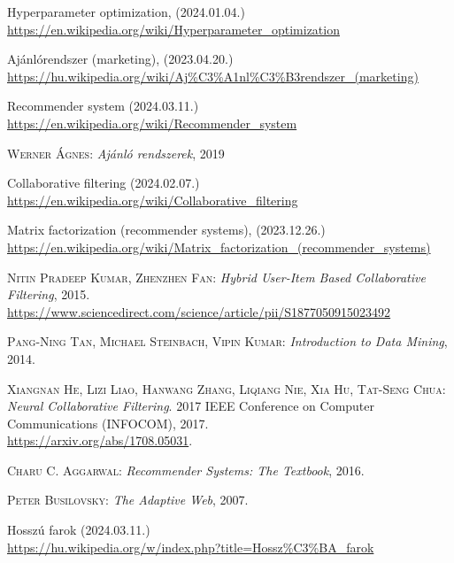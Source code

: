 \documentclass[
]{thesis-ekf}
\theoremstyle{definition}
\theoremstyle{remark}
\begin{document}
\begin{thebibliography}{2}
Hyperparameter optimization, (2024.01.04.)
\\\url{https://en.wikipedia.org/wiki/Hyperparameter_optimization}

Ajánlórendszer (marketing), (2023.04.20.)
\\\url{https://hu.wikipedia.org/wiki/Aj%C3%A1nl%C3%B3rendszer_(marketing)}

Recommender system (2024.03.11.)
\\\url{https://en.wikipedia.org/wiki/Recommender_system}

\textsc{Werner Ágnes}: \emph{Ajánló rendszerek}, 2019

Collaborative filtering (2024.02.07.)
\\\url{https://en.wikipedia.org/wiki/Collaborative_filtering}

Matrix factorization (recommender systems), (2023.12.26.)
\\\url{https://en.wikipedia.org/wiki/Matrix_factorization_(recommender_systems)}

\textsc{Nitin Pradeep Kumar, Zhenzhen Fan}: \emph{Hybrid User-Item Based Collaborative Filtering}, 2015. \\\url{https://www.sciencedirect.com/science/article/pii/S1877050915023492}

\textsc{Pang-Ning Tan, Michael Steinbach, Vipin Kumar}: \emph{Introduction to Data Mining}, 2014.

\textsc{Xiangnan He, Lizi Liao, Hanwang Zhang, Liqiang Nie, Xia Hu, Tat-Seng Chua}: \emph{Neural Collaborative Filtering}. 2017 IEEE Conference on Computer Communications (INFOCOM), 2017. 
\\\url{https://arxiv.org/abs/1708.05031}.

\textsc{Charu C. Aggarwal}: \emph{Recommender Systems: The Textbook}, 2016.

\textsc{Peter Busilovsky}: \emph{The Adaptive Web}, 2007.

Hosszú farok (2024.03.11.)
\\\url{https://hu.wikipedia.org/w/index.php?title=Hossz%C3%BA_farok}


\end{thebibliography}
\end{document}

